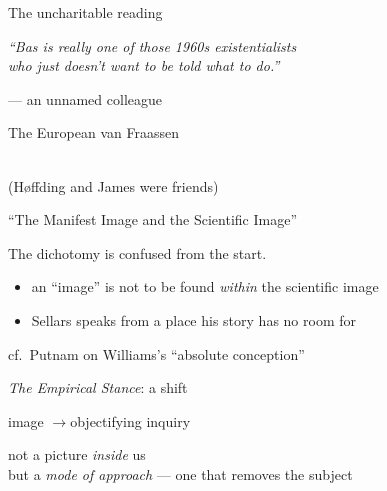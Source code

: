 \documentclass[11pt,aspectratio=169]{beamer}
\begin{document}
\begin{frame}{The uncharitable reading}
  \begin{center}
    \itshape ``Bas is really one of those 1960s existentialists\\
    who just doesn't want to be told what to do.''
  \end{center}
  \vspace{1em}
  \begin{center}
    {\small\color{faint} --- an unnamed colleague}
  \end{center}
\end{frame}

\begin{frame}{The European van Fraassen}
  \centering
  \vspace{0.5em}
  \\{\footnotesize\color{faint} (Høffding and James were friends)}
\end{frame}

\begin{frame}{``The Manifest Image and the Scientific Image''}
  \begin{center}
    The dichotomy is \alert{confused from the start.}
  \end{center}
  \vspace{1em}
  \begin{itemize}
    \item an ``image'' is not to be found \emph{within} the scientific image
    \item Sellars speaks from a place his story has no room for
  \end{itemize}
  \vspace{0.5em}
  \hfill{\footnotesize\color{faint} cf.\ Putnam on Williams's ``absolute conception''}
\end{frame}

\begin{frame}{\emph{The Empirical Stance}: a shift}
  \begin{center}
    \large image \quad$\longrightarrow$\quad \alert{objectifying inquiry}
  \end{center}
  \vspace{1.2em}
  \begin{center}
    not a picture \emph{inside} us\\
    but a \emph{mode of approach} --- one that removes the subject
  \end{center}
\end{frame}
\end{document}
